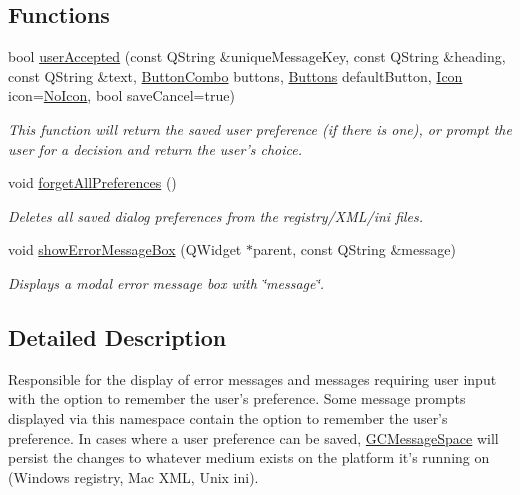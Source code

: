 \subsection*{\-Functions}
\begin{DoxyCompactItemize}
\item 
bool \hyperlink{namespace_g_c_message_space_ae6f97d25f38a6b35c49e6e67ce4afaca}{user\-Accepted} (const \-Q\-String \&unique\-Message\-Key, const \-Q\-String \&heading, const \-Q\-String \&text, \hyperlink{namespace_g_c_message_space_ac1db082c29062fe6508ba03bf76bea44}{\-Button\-Combo} buttons, \hyperlink{namespace_g_c_message_space_a631906a7d53f30328cf2249a00078b5b}{\-Buttons} default\-Button, \hyperlink{namespace_g_c_message_space_a67e94586e09cbc305257fbcdd7b686e2}{\-Icon} icon=\hyperlink{namespace_g_c_message_space_a67e94586e09cbc305257fbcdd7b686e2a54bba077357d6db019fb791266e133f0}{\-No\-Icon}, bool save\-Cancel=true)
\begin{DoxyCompactList}\small\item\em \-This function will return the saved user preference (if there is one), or prompt the user for a decision and return the user's choice. \end{DoxyCompactList}\item 
void \hyperlink{namespace_g_c_message_space_ad9b01668af8368ac7e2c69065d45bf19}{forget\-All\-Preferences} ()
\begin{DoxyCompactList}\small\item\em \-Deletes all saved dialog preferences from the registry/\-X\-M\-L/ini files. \end{DoxyCompactList}\item 
void \hyperlink{namespace_g_c_message_space_ab118b3a133686167617eb955029fd44e}{show\-Error\-Message\-Box} (\-Q\-Widget $\ast$parent, const \-Q\-String \&message)
\begin{DoxyCompactList}\small\item\em \-Displays a modal error message box with \char`\"{}message\char`\"{}. \end{DoxyCompactList}\end{DoxyCompactItemize}


\subsection{\-Detailed \-Description}
\-Responsible for the display of error messages and messages requiring user input with the option to remember the user's preference. \-Some message prompts displayed via this namespace contain the option to remember the user's preference. \-In cases where a user preference can be saved, \hyperlink{namespace_g_c_message_space}{\-G\-C\-Message\-Space} will persist the changes to whatever medium exists on the platform it's running on (\-Windows registry, \-Mac \-X\-M\-L, \-Unix ini).

